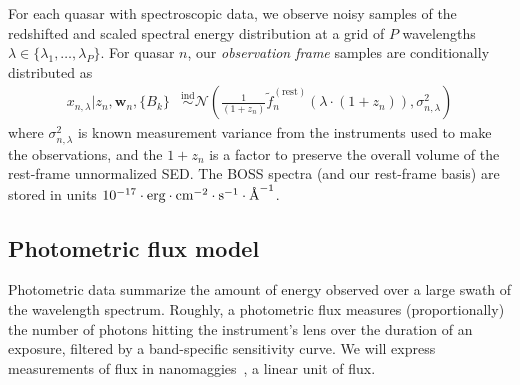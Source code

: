 \documentclass{article} %
\begin{document}
For each quasar with spectroscopic data, we observe noisy samples of the redshifted and scaled spectral energy distribution at a grid of $P$ wavelengths ${\lambda \in \{\lambda_1, \dots, \lambda_P \}}$.
For quasar $n$, our \emph{observation frame} samples are conditionally distributed as
\begin{align}
  x_{n, \lambda} | z_n, \mathbf{w}_n, \{ B_k \} 
    &\stackrel{\textrm{ind}}{\sim} \mathcal{N}\left( \frac{1}{(1 + z_n)} \tilde f_n^{(\text{rest})}( \lambda \cdot (1 + z_n) ), \sigma_{n,\lambda}^2 \right)
    \label{eq:spec} 
\end{align}
where $\sigma_{n, \lambda}^2$ is known measurement variance from the instruments used to make the observations, and the $1+z_n$ is a factor to preserve the overall volume of the rest-frame unnormalized SED. 
The BOSS spectra (and our rest-frame basis) are stored in units ${10^{-17} \cdot \text{erg} \cdot \text{cm}^{-2} \cdot \text{s}^{-1} \cdot \textup{\AA}^{-1}}$.  

\subsection{Photometric flux model }
Photometric data summarize the amount of energy observed over a large swath of the wavelength spectrum. 
Roughly, a photometric flux measures (proportionally) the number of photons hitting the instrument's lens over the duration of an exposure, filtered by a band-specific sensitivity curve. 
We will express measurements of flux in nanomaggies~\cite{sdssnanomaggies}, a linear unit of flux. 
\end{document}
